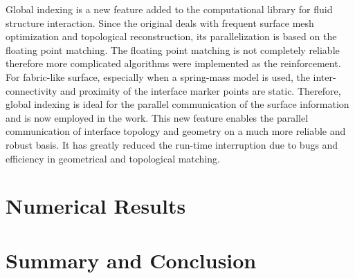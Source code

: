Global indexing is a new feature added to the \FronTierp computational library
for fluid structure interaction.  Since the original \FronTierp
\cite{DuFixGli05} deals with frequent surface mesh optimization and topological
reconstruction, its parallelization is based on the floating point matching.
The floating point matching is not completely reliable therefore more
complicated algorithms were implemented as the reinforcement.  For fabric-like
surface, especially when a spring-mass model is used, the inter-connectivity and
proximity of the interface marker points are static. Therefore, global indexing
is ideal for the parallel communication of the surface information and is now
employed in the work.  This new feature enables the parallel communication of
interface topology and geometry on a much more reliable and robust basis. It has
greatly reduced the run-time interruption due to bugs and efficiency in
geometrical and topological matching.

\section{Numerical Results}

\section{Summary and Conclusion}
